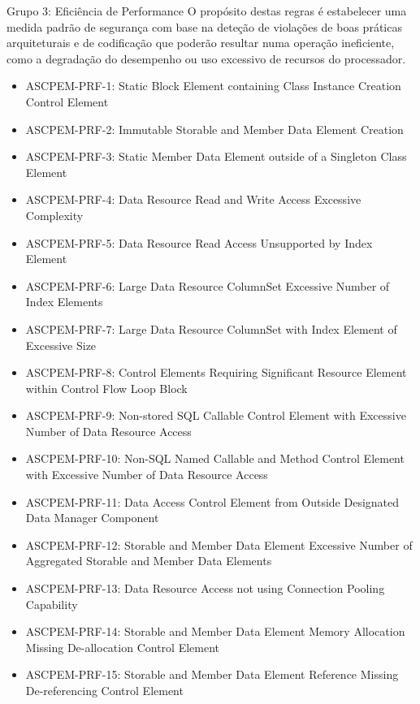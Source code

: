 \documentclass[openany,10pt,a4paper]{article}
\begin{document}
\begin{appendix}
Grupo 3: Eficiência de Performance
O propósito destas regras é estabelecer uma medida padrão de segurança com base na deteção de violações de boas práticas arquiteturais e de codificação que poderão resultar numa operação ineficiente, como a degradação do desempenho ou uso excessivo de recursos do processador.
\begin{itemize}	
\setlength\itemsep{0em}
	\item ASCPEM-PRF-1: Static Block Element containing Class Instance Creation Control Element
	\item ASCPEM-PRF-2: Immutable Storable and Member Data Element Creation
	\item ASCPEM-PRF-3: Static Member Data Element outside of a Singleton Class Element
	\item ASCPEM-PRF-4: Data Resource Read and Write Access Excessive Complexity
	\item ASCPEM-PRF-5: Data Resource Read Access Unsupported by Index Element
	\item ASCPEM-PRF-6: Large Data Resource ColumnSet Excessive Number of Index Elements
	\item ASCPEM-PRF-7: Large Data Resource ColumnSet with Index Element of Excessive Size
	\item ASCPEM-PRF-8: Control Elements Requiring Significant Resource Element within Control Flow Loop Block
	\item ASCPEM-PRF-9: Non-stored SQL Callable Control Element with Excessive Number of Data Resource Access
	\item ASCPEM-PRF-10: Non-SQL Named Callable and Method Control Element with Excessive Number of Data Resource Access
	\item ASCPEM-PRF-11: Data Access Control Element from Outside Designated Data Manager Component
	\item ASCPEM-PRF-12: Storable and Member Data Element Excessive Number of Aggregated Storable and Member Data Elements
	\item ASCPEM-PRF-13: Data Resource Access not using Connection Pooling Capability
	\item ASCPEM-PRF-14: Storable and Member Data Element Memory Allocation Missing De-allocation Control Element
	\item ASCPEM-PRF-15: Storable and Member Data Element Reference Missing De-referencing Control Element
\end{itemize}


\end{appendix}
\end{document}
